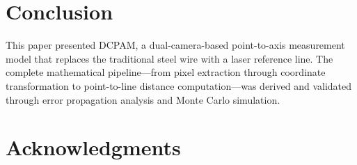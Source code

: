 \section{Conclusion}

This paper presented DCPAM, a dual-camera-based
point-to-axis measurement model that replaces the
traditional steel wire with a laser reference line.
%
The complete mathematical pipeline---from pixel
extraction through coordinate transformation to
point-to-line distance computation---was derived
and validated through error propagation analysis
and Monte Carlo simulation.



\section*{Acknowledgments}




